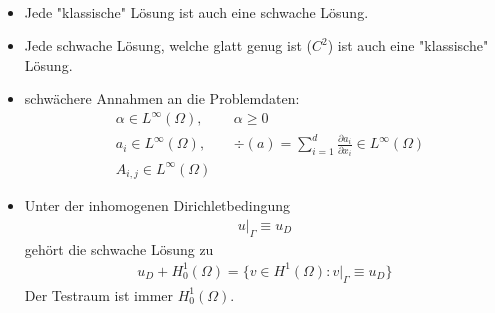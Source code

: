 \begin{bemerkung}\ %
	\begin{itemize}
		\item Jede "klassische" Lösung ist auch eine schwache Lösung. 
		\item Jede schwache Lösung, welche glatt genug ist ($C^2$) ist auch eine "klassische" Lösung.
		\item schwächere Annahmen an die Problemdaten:
		\begin{align*}
			&\alpha\in L^\infty(\Omega), &&\alpha\geq0\\
			&a_i\in L^\infty(\Omega), &&\div(a)=\sum\limits_{i=1}^d\frac{\partial a_i}{\partial x_i}\in L^\infty(\Omega)\\
			&A_{i,j}\in L^\infty(\Omega)
		\end{align*}
		\item Unter der inhomogenen Dirichletbedingung
		\begin{align*}
			u|_\Gamma\equiv u_D
		\end{align*}
		gehört die schwache Lösung zu
		\begin{align*}
			u_D+H_0^1(\Omega)=\big\lbrace v\in H^1(\Omega):v|_\Gamma\equiv u_D\big\rbrace
		\end{align*}
		Der Testraum ist immer $H^1_0(\Omega)$.
	\end{itemize}
\end{bemerkung}

